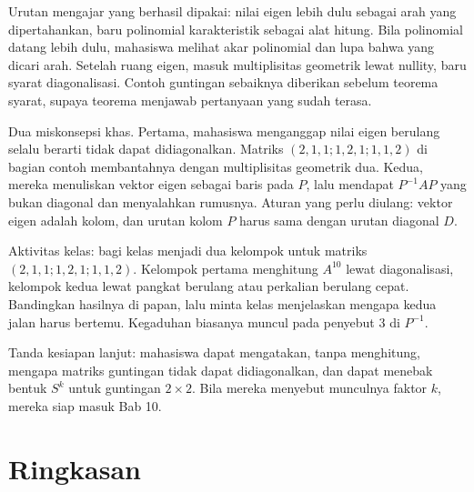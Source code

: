 \begin{untukdosen}
Urutan mengajar yang berhasil dipakai: nilai eigen lebih dulu sebagai arah yang dipertahankan,
baru polinomial karakteristik sebagai alat hitung. Bila polinomial datang lebih dulu, mahasiswa
melihat akar polinomial dan lupa bahwa yang dicari arah. Setelah ruang eigen, masuk multiplisitas
geometrik lewat nullity, baru syarat diagonalisasi. Contoh guntingan sebaiknya diberikan sebelum
teorema syarat, supaya teorema menjawab pertanyaan yang sudah terasa.

Dua miskonsepsi khas. Pertama, mahasiswa menganggap nilai eigen berulang selalu berarti tidak
dapat didiagonalkan. Matriks $(2,1,1;1,2,1;1,1,2)$ di bagian contoh membantahnya dengan
multiplisitas geometrik dua. Kedua, mereka menuliskan vektor eigen sebagai baris pada $P$, lalu
mendapat $P^{-1}AP$ yang bukan diagonal dan menyalahkan rumusnya. Aturan yang perlu diulang:
vektor eigen adalah kolom, dan urutan kolom $P$ harus sama dengan urutan diagonal $D$.

Aktivitas kelas: bagi kelas menjadi dua kelompok untuk matriks $(2,1,1;1,2,1;1,1,2)$. Kelompok
pertama menghitung $A^{10}$ lewat diagonalisasi, kelompok kedua lewat pangkat berulang atau
perkalian berulang cepat. Bandingkan hasilnya di papan, lalu minta kelas menjelaskan mengapa kedua
jalan harus bertemu. Kegaduhan biasanya muncul pada penyebut $3$ di $P^{-1}$.

Tanda kesiapan lanjut: mahasiswa dapat mengatakan, tanpa menghitung, mengapa matriks guntingan
tidak dapat didiagonalkan, dan dapat menebak bentuk $S^{k}$ untuk guntingan $2\times2$. Bila
mereka menyebut munculnya faktor $k$, mereka siap masuk Bab 10.
\end{untukdosen}

\section{Ringkasan}

